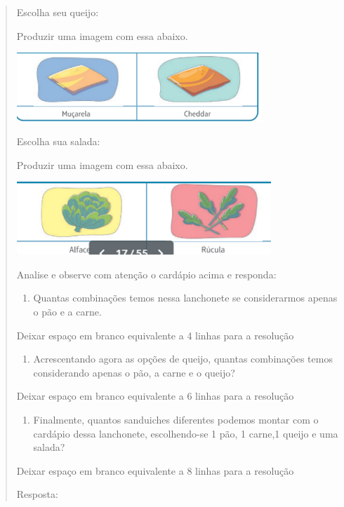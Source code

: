 \begin{enumerate}
\begin{escolha}
\begin{enumerate}
\begin{itemize}
\begin{itemize}
\begin{escolha}
\begin{quote}
\begin{escolha}
{Escolha seu queijo:

Produzir uma imagem com essa abaixo.

\includegraphics[width=3.64103in,height=1.02299in]{media/image136.png}

Escolha sua salada:

Produzir uma imagem com essa abaixo.

\includegraphics[width=3.76923in,height=1.08430in]{media/image137.png}

Analise e observe com atenção o cardápio acima e responda:

\begin{enumerate}
\def\labelenumi{\alph{enumi})}
\item
  Quantas combinações temos nessa lanchonete se considerarmos apenas o
  pão e a carne.
\end{enumerate}

Deixar espaço em branco equivalente a 4 linhas para a resolução

\begin{enumerate}
\def\labelenumi{\alph{enumi})}
\item
  Acrescentando agora as opções de queijo, quantas combinações temos
  considerando apenas o pão, a carne e o queijo?
\end{enumerate}

Deixar espaço em branco equivalente a 6 linhas para a resolução

\begin{enumerate}
\def\labelenumi{\alph{enumi})}
\item
  Finalmente, quantos sanduiches diferentes podemos montar com o
  cardápio dessa lanchonete, escolhendo-se 1 pão, 1 carne,1 queijo e uma
  salada?
\end{enumerate}

Deixar espaço em branco equivalente a 8 linhas para a resolução

Resposta:

}
\end{escolha}
\end{quote}
\end{escolha}
\end{itemize}
\end{itemize}
\end{enumerate}
\end{escolha}
\end{enumerate}
